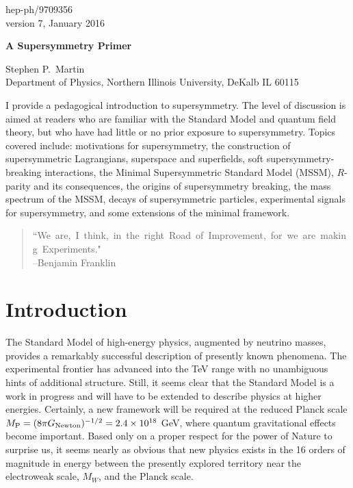 \documentclass[12pt]{article}
\def\MPlanck{M_{\rm P}}
\begin{document}
\setcounter{footnote}{1}
\begin{flushright}
hep-ph/9709356\\
version 7, January 2016
\end{flushright}

\begin{center}
{\Large\bf A Supersymmetry Primer}\\

\vspace{0.14in}

{\sc Stephen P.~Martin} \\
Department of Physics, Northern Illinois University, DeKalb IL 60115 
\end{center}

\begin{center}
\begin{minipage}[]{0.86\linewidth}
I provide a pedagogical introduction to supersymmetry. The level of 
discussion is aimed at readers who are familiar with the Standard Model 
and quantum field theory, but who have had little or no prior exposure to 
supersymmetry. Topics covered include: motivations for supersymmetry, the 
construction of supersymmetric Lagrangians, superspace and superfields, 
soft supersymmetry-breaking interactions, the Minimal Supersymmetric 
Standard Model (MSSM), $R$-parity and its consequences, the origins of 
supersymmetry breaking, the mass spectrum of the MSSM, decays of 
supersymmetric particles, experimental signals for supersymmetry, and 
some extensions of the minimal framework.
\end{minipage}
\end{center}

\tableofcontents
\newpage
\setlength{\baselineskip}{1.05\baselineskip}
\begin{quotation}
\noindent
\mbox{``We are, I think, in the right Road of Improvement, for we are making Experiments."}\\
--Benjamin Franklin
\end{quotation}

\section{Introduction}\label{sec:intro}
\setcounter{equation}{0}
\setcounter{figure}{0}
\setcounter{table}{0}
\setcounter{footnote}{1}

The Standard Model of high-energy physics, augmented by neutrino masses,
provides a remarkably successful description of presently known phenomena.
The experimental frontier has advanced into the TeV range with no
unambiguous hints of additional structure. Still, it seems clear that the
Standard Model is a work in progress and will have to be extended to
describe physics at higher energies. Certainly, a new framework will be
required at the reduced Planck scale
$\MPlanck = (8 \pi G_{\rm Newton})^{-1/2} = 2.4 \times 10^{18}$ GeV, 
where quantum gravitational effects become important. Based only on a
proper respect for the power of Nature to surprise us, it seems nearly as
obvious that new physics exists in the 16 orders of magnitude in energy
between the presently explored territory near the electroweak scale,
$M_W$, and the Planck scale. 
\end{document}
